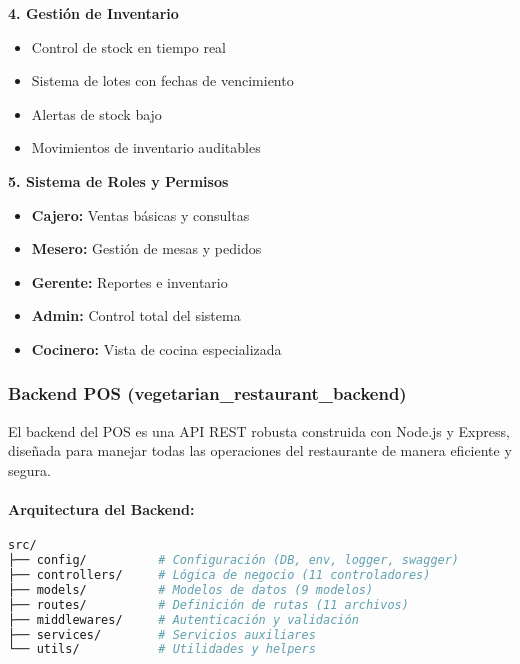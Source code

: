 \documentclass[12pt,a4paper]{article}
\begin{document}
\textbf{4. Gestión de Inventario}
\begin{itemize}
    \item Control de stock en tiempo real
    \item Sistema de lotes con fechas de vencimiento
    \item Alertas de stock bajo
    \item Movimientos de inventario auditables
\end{itemize}

\textbf{5. Sistema de Roles y Permisos}
\begin{itemize}
    \item \textbf{Cajero:} Ventas básicas y consultas
    \item \textbf{Mesero:} Gestión de mesas y pedidos
    \item \textbf{Gerente:} Reportes e inventario
    \item \textbf{Admin:} Control total del sistema
    \item \textbf{Cocinero:} Vista de cocina especializada
\end{itemize}

\subsubsection{Backend POS (vegetarian\_restaurant\_backend)}

El backend del POS es una API REST robusta construida con Node.js y Express, diseñada para manejar todas las operaciones del restaurante de manera eficiente y segura.

\paragraph{Arquitectura del Backend:}

\begin{lstlisting}[language=bash, caption=Estructura del Código Backend]
src/
├── config/          # Configuración (DB, env, logger, swagger)
├── controllers/     # Lógica de negocio (11 controladores)
├── models/          # Modelos de datos (9 modelos)
├── routes/          # Definición de rutas (11 archivos)
├── middlewares/     # Autenticación y validación
├── services/        # Servicios auxiliares
└── utils/           # Utilidades y helpers
\end{lstlisting}
\end{document}
